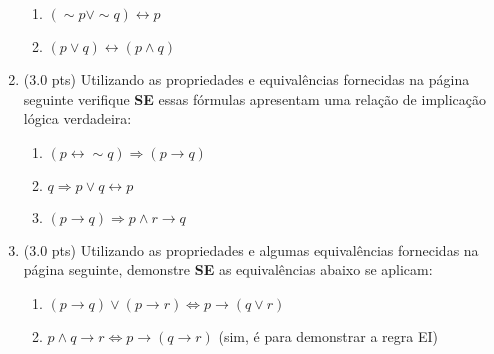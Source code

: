 \documentclass[12pt]{article}
\begin{document}
\begin{enumerate}
\begin{enumerate}
\item $(\sim p \vee \sim q) \leftrightarrow p$

\item $(p \vee q) \leftrightarrow (p \wedge q) $
\end{enumerate}

\item (3.0 pts) Utilizando as propriedades e equivalências
fornecidas na página seguinte verifique {\bf SE} 
essas fórmulas apresentam uma relaç\~ao de implicaç\~ao lógica  
verdadeira:

\begin{enumerate}
\setlength{\itemsep}{-2pt}




\item $(p \leftrightarrow \sim q) \Rightarrow (p \rightarrow q)$

\item $q \Rightarrow p \vee q \leftrightarrow p$


\item $(p \rightarrow q) \Rightarrow p \wedge r \rightarrow q $

\end{enumerate}


\item (3.0 pts) Utilizando as propriedades e algumas equivalências
fornecidas na página seguinte, demonstre {\bf SE} as equivalências abaixo 
se aplicam:

\begin{enumerate}
\setlength{\itemsep}{-2pt}


\item  $(p \rightarrow q) \vee (p \rightarrow r) \Leftrightarrow p  \rightarrow  (q \vee r) $ %


\item $p \wedge q \rightarrow r \Leftrightarrow p \rightarrow (q \rightarrow r) $  {\scriptsize (sim, é para demonstrar a regra EI)}


\end{enumerate}
\end{enumerate}
\end{document}
